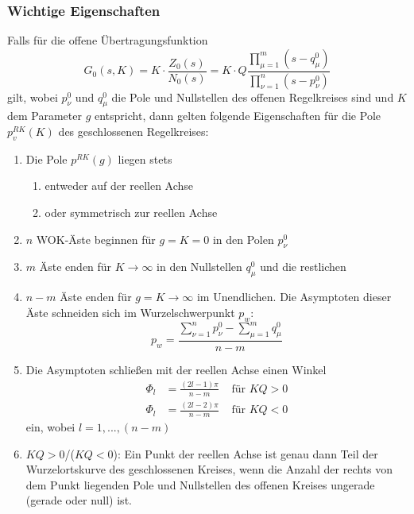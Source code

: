\documentclass[a4paper,twocolumn,10pt]{article}
\begin{document}
\subsubsection{Wichtige Eigenschaften}
Falls für die offene Übertragungsfunktion
\begin{equation*}
G_0(s,K)=K\cdot\frac{Z_0(s)}{N_0(s)}=K\cdot Q\frac{\prod\limits_{\mu=1}^{m}(s-q_{\mu}^0)}{\prod\limits_{\nu=1}^{n}(s-p_{\nu}^0)}
\end{equation*}
gilt, wobei $p_{\nu}^0$ und $q_{\mu}^0$ die Pole und Nullstellen des offenen Regelkreises sind und $K$ dem Parameter $g$ entspricht, dann gelten folgende Eigenschaften für die Pole $p_v^{RK}(K)$ des geschlossenen Regelkreises:
\begin{enumerate}[label=$\bullet$]
\item Die Pole $p^{RK}(g)$ liegen stets
\begin{enumerate}[label=-]
\item entweder auf der reellen Achse
\item oder symmetrisch zur reellen Achse
\end{enumerate}
\item $n$ WOK-Äste beginnen für $g=K=0$ in den Polen $p_{\nu}^0$
\item $m$ Äste enden für $K\rightarrow\infty$ in den Nullstellen $q_{\mu}^0$ und die restlichen
\item $n-m$ Äste enden für $g=K\rightarrow\infty$ im Unendlichen. Die Asymptoten dieser Äste schneiden sich im Wurzelschwerpunkt $p_w$:
\begin{equation*}
p_w=\frac{\sum\limits_{\nu=1}^{n}p_{\nu}^0-\sum\limits_{\mu=1}^{m}q_{\mu}^0}{n-m}
\end{equation*}
\item Die Asymptoten schließen mit der reellen Achse einen Winkel
\begin{equation*}
\begin{split}
\Phi_l&=\frac{(2l-1)\pi}{n-m}\;\;\;\;\text{für }KQ>0\\
\Phi_l&=\frac{(2l-2)\pi}{n-m}\;\;\;\;\text{für }KQ<0
\end{split}
\end{equation*}
ein, wobei $l=1,...,(n-m)$
\item $KQ>0$/($KQ<0$): Ein Punkt der reellen Achse ist genau dann Teil der Wurzelortskurve des geschlossenen Kreises, wenn die Anzahl der rechts von dem Punkt liegenden Pole und Nullstellen des offenen Kreises ungerade (gerade oder null) ist.
\end{enumerate}
\end{document}
